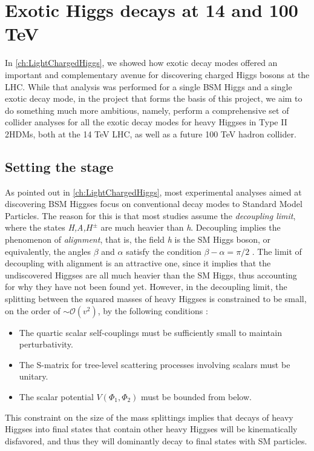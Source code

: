 \chapter{Exotic Higgs decays at 14 and 100 TeV}\label{ch:ExoticHiggs}

In \autoref{ch:LightChargedHiggs}, we showed how exotic decay modes offered an important and complementary avenue for discovering charged Higgs bosons at the LHC. While that analysis was performed for a single BSM Higgs and a single exotic decay mode, in the project that forms the basis of this project, we aim to do something much more ambitious, namely, perform a comprehensive set of collider analyses for all the exotic decay modes for heavy Higgses in Type II 2HDMs, both at the 14 TeV LHC, as well as a future 100 TeV hadron collider.

\section{Setting the stage}
As pointed out in \autoref{ch:LightChargedHiggs}, most experimental analyses aimed at discovering BSM Higgses focus on conventional decay modes to Standard Model Particles. The reason for this is that most studies assume the \emph{decoupling limit}, where the states \emph{H,A,$H^\pm$} are much heavier than \emph{h}. Decoupling implies the phenomenon of \emph{alignment}, that is, the field \emph{h} is the SM Higgs boson, or equivalently, the angles $\beta$ and $\alpha$ satisfy the condition $\beta-\alpha = \pi/2$ \cite{Contino:2016spe}. The limit of decoupling with alignment is an attractive one, since it implies that the undiscovered Higgses are all much heavier than the SM Higgs, thus accounting for why they have not been found yet. However, in the decoupling limit, the splitting between the squared masses of heavy Higgses is constrained to be small, on the order of $\sim\mathcal{O}(v^2)$, by the following conditions \cite{Gunion:2002zf}:
\begin{itemize}
\item The quartic scalar self-couplings must be sufficiently small to maintain perturbativity.
\item The S-matrix for tree-level scattering processes involving scalars must be unitary.
\item The scalar potential $V(\Phi_1,\Phi_2)$ must be bounded from below. 
\end{itemize}
This constraint on the size of the mass splittings implies that decays of heavy Higgses into final states that contain other heavy Higgses will be kinematically disfavored, and thus they will dominantly decay to final states with SM particles.

